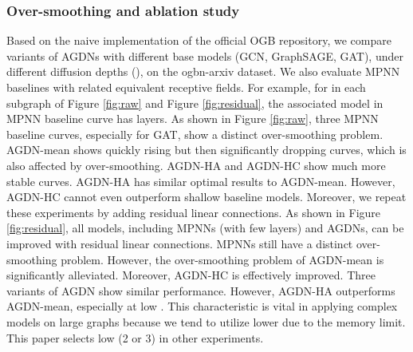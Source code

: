\documentclass{article}
\begin{document}
\subsubsection{Over-smoothing and ablation study}
Based on the naive implementation of the official OGB repository, we compare variants of AGDNs with different base models (GCN, GraphSAGE, GAT), under different diffusion depths  (), on the ogbn-arxiv dataset. We also evaluate MPNN baselines with related equivalent receptive fields. For example, for  in each subgraph of Figure \ref{fig:raw} and Figure \ref{fig:residual}, the associated model in MPNN baseline curve has  layers.
As shown in Figure \ref{fig:raw}, three MPNN baseline curves, especially for GAT, show a distinct over-smoothing problem. AGDN-mean shows quickly rising but then significantly dropping curves, which is also affected by over-smoothing. AGDN-HA and AGDN-HC show much more stable curves. AGDN-HA has similar optimal results to AGDN-mean. However, AGDN-HC cannot even outperform shallow baseline models.
Moreover, we repeat these experiments by adding residual linear connections. As shown in Figure \ref{fig:residual}, all models, including MPNNs (with few layers) and AGDNs, can be improved with residual linear connections. MPNNs still have a distinct over-smoothing problem. However, the over-smoothing problem of AGDN-mean is significantly alleviated. Moreover, AGDN-HC is effectively improved. Three variants of AGDN show similar performance. However, AGDN-HA outperforms AGDN-mean, especially at low . This characteristic is vital in applying complex models on large graphs because we tend to utilize lower  due to the memory limit. This paper selects low  (2 or 3) in other experiments.
\end{document}
